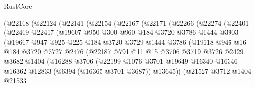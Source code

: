 \begin{lexlean}{RustCore}
\begin{coremodule}
            (@22108
              (@22124
                (@22141
                  (@22154
                    (@22167
                      (@22171
                        (@22266
                          (@22274
                            (@22401
                              (@22409
                                @22417
                                (@19607
                                  @950
                                  @300
                                  @960
                                  @184
                                  @3720
                                  @3786
                                  @1444
                                  @3903
                                  (@19607
                                    @947
                                    @925
                                    @225
                                    @184
                                    @3720
                                    @3729
                                    @1444
                                    @3786
                                    (@19618
                                      @946
                                      @16
                                      @184
                                      @3720
                                      @3727
                                      @2476
                                      (@22187
                                        @791
                                        @11
                                        @15
                                        @3706
                                        @3719
                                        @3726
                                        @2429
                                        @3682
                                        @1404
                                        (@16288
                                          @3706
                                          (@22199
                                            @1076
                                            @3701
                                            @19649
                                            @16340
                                            @16346
                                            @16362
                                            @12833
                                            (@6394 (@16365 @3701 @3687))
                                            @13645))
                                        (@21527
                                          @3712
                                          @1404
                                          @21533

\end{coremodule}
\end{lexlean}
